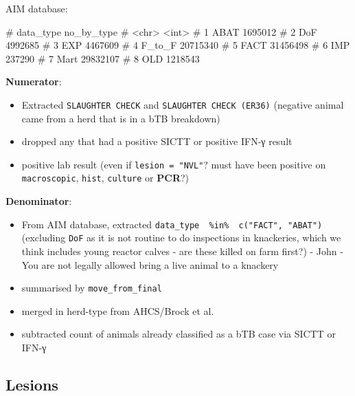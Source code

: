 \documentclass[
  letterpaper,
  DIV=11,
  numbers=noendperiod]{scrreprt}
\newenvironment{Shaded}{\begin{snugshade}}{\end{snugshade}}
\newcommand{\CommentTok}[1]{\textcolor[rgb]{0.37,0.37,0.37}{#1}}
\providecommand{\tightlist}{%
  \setlength{\itemsep}{0pt}\setlength{\parskip}{0pt}}
\begin{document}
AIM database:

\begin{Shaded}
\begin{Highlighting}[]
\CommentTok{\#   data\_type no\_by\_type}
\CommentTok{\#   \textless{}chr\textgreater{}          \textless{}int\textgreater{}}
\CommentTok{\# 1 ABAT         1695012}
\CommentTok{\# 2 DoF          4992685}
\CommentTok{\# 3 EXP          4467609}
\CommentTok{\# 4 F\_to\_F      20715340}
\CommentTok{\# 5 FACT        31456498}
\CommentTok{\# 6 IMP           237290}
\CommentTok{\# 7 Mart        29832107}
\CommentTok{\# 8 OLD          1218543}
\end{Highlighting}
\end{Shaded}

\textbf{Numerator}:

\begin{itemize}
\tightlist
\item
  Extracted \texttt{SLAUGHTER\ CHECK} and
  \texttt{SLAUGHTER\ CHECK\ (ER36)} (negative animal came from a herd
  that is in a bTB breakdown)
\item
  dropped any that had a positive SICTT or positive IFN-γ result
\item
  positive lab result (even if \texttt{lesion\ =\ "NVL"}? must have been
  positive on \texttt{macroscopic}, \texttt{hist}, \texttt{culture} or
  \textbf{PCR}?)
\end{itemize}

\textbf{Denominator}:

\begin{itemize}
\tightlist
\item
  From AIM database, extracted
  \texttt{data\_type\ \ \%in\%\ \ c("FACT",\ "ABAT")} (excluding
  \texttt{DoF} as it is not routine to do inspections in knackeries,
  which we think includes young reactor calves - are these killed on
  farm first?) - John - You are not legally allowed bring a live animal
  to a knackery
\item
  summarised by \texttt{move\_from\_final}
\item
  merged in herd-type from AHCS/Brock et al.\\
\item
  subtracted count of animals already classified as a bTB case via SICTT
  or IFN-γ
\end{itemize}

\subsection{Lesions}\label{lesions}
\end{document}
